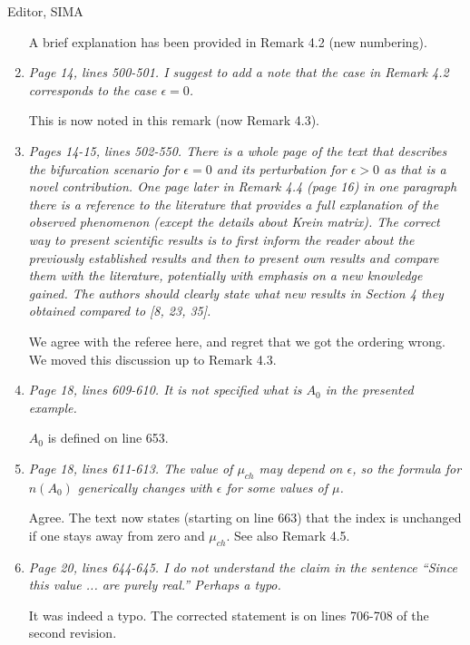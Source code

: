 \documentclass[11pt]{letter}
\begin{document}
\begin{letter}{Editor, SIMA}
\begin{enumerate}
A brief explanation has been provided in Remark 4.2 (new numbering).

\item \emph{Page 14, lines 500-501. I suggest to add a note that the case in Remark 4.2 corresponds to the case $\epsilon = 0$.}
\vspace{4mm}

This is now noted in this remark (now Remark 4.3).

\item \emph{Pages 14-15, lines 502-550. There is a whole page of the text that describes the bifurcation scenario for $\epsilon = 0$ and its perturbation for $\epsilon > 0$ as that is a novel contribution. One page later in Remark 4.4 (page 16) in one paragraph there is a reference to the literature that provides a full explanation of the observed phenomenon (except the details about Krein matrix). The correct way to present scientific results is to first inform the reader about the previously established results and then to present own results and compare them with the literature, potentially with emphasis on a new knowledge gained. The authors should clearly state what new results in Section 4 they obtained compared to [8, 23, 35].}
\vspace{4mm}

We agree with the referee here, and regret that we got the ordering wrong. We moved this discussion up to Remark 4.3.

\item \emph{Page 18, lines 609-610. It is not specified what is $A_0$ in the presented example.}
\vspace{4mm}

$A_0$ is defined on line 653.

\item \emph{Page 18, lines 611-613. The value of $\mu_{ch}$ may depend on $\epsilon$, so the formula for $n(A_0)$ generically changes with $\epsilon$ for some values of $\mu$.}
\vspace{4mm}

Agree. The text now states (starting on line 663) that the index is unchanged if one stays away from zero and $\mu_{ch}$. See also Remark 4.5.

\item \emph{Page 20, lines 644-645. I do not understand the claim in the sentence ``Since this value ... are purely real.'' Perhaps a typo.}
\vspace{4mm}

It was indeed a typo.  The corrected statement is on lines 706-708 of the second revision.


\end{enumerate}
\end{letter}
\end{document}
